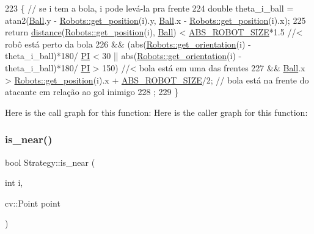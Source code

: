 \begin{DoxyCode}
223                              \{ \textcolor{comment}{// se i tem a bola, i pode levá-la pra frente}
224     \textcolor{keywordtype}{double} theta\_i\_ball = atan2(\hyperlink{class_strategy_abd16b6276e747f6cd99a19963ff5495b}{Ball}.y - \hyperlink{class_robots_a1fca8f2f5070176faa6ba1efa2f1ff14}{Robots::get\_position}(i).y, 
      \hyperlink{class_strategy_abd16b6276e747f6cd99a19963ff5495b}{Ball}.x - \hyperlink{class_robots_a1fca8f2f5070176faa6ba1efa2f1ff14}{Robots::get\_position}(i).x);
225     \textcolor{keywordflow}{return} \hyperlink{class_strategy_aacce05caed71553c4efd2d28c9c3aa39}{distance}(\hyperlink{class_robots_a1fca8f2f5070176faa6ba1efa2f1ff14}{Robots::get\_position}(i), \hyperlink{class_strategy_abd16b6276e747f6cd99a19963ff5495b}{Ball}) < 
      \hyperlink{namespace_c_o_n_s_t_a8d0d7fe4341b9129cabd565ef16a0640}{ABS\_ROBOT\_SIZE}*1.5 \textcolor{comment}{//< robô está perto da bola}
226            && (abs(\hyperlink{class_robots_ae1d0829c1089322c8fac5830f65b13a0}{Robots::get\_orientation}(i) - theta\_i\_ball)*180/
      \hyperlink{strategy_8cpp_a598a3330b3c21701223ee0ca14316eca}{PI} < 30 || abs(\hyperlink{class_robots_ae1d0829c1089322c8fac5830f65b13a0}{Robots::get\_orientation}(i) - theta\_i\_ball)*180/
      \hyperlink{strategy_8cpp_a598a3330b3c21701223ee0ca14316eca}{PI} > 150) \textcolor{comment}{//< bola está em uma das frentes}
227            && \hyperlink{class_strategy_abd16b6276e747f6cd99a19963ff5495b}{Ball}.x > \hyperlink{class_robots_a1fca8f2f5070176faa6ba1efa2f1ff14}{Robots::get\_position}(i).x + 
      \hyperlink{namespace_c_o_n_s_t_a8d0d7fe4341b9129cabd565ef16a0640}{ABS\_ROBOT\_SIZE}/2; \textcolor{comment}{// bola está na frente do atacante em relação ao gol inimigo}
228     ;
229 \}
\end{DoxyCode}
Here is the call graph for this function\+:
Here is the caller graph for this function\+:
\mbox{\label{class_strategy_a39e538cde3f236f918ad8b7501c92987}} 
\subsubsection{\texorpdfstring{is\+\_\+near()}{is\_near()}}
{\footnotesize\ttfamily bool Strategy\+::is\+\_\+near (\begin{DoxyParamCaption}\item[{int}]{i,  }\item[{cv\+::\+Point}]{point }\end{DoxyParamCaption})}



